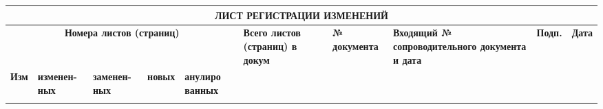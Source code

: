 \documentclass[11pt]{article}
\begin{document}
\newpage
\begin{table}[ht]
    \centering
    \begin{tabularx}{\textwidth}{|X|X|X|X|X|X|X|X|X|X|}
        \hline
        \multicolumn{10}{|c|}{\textbf{ЛИСТ РЕГИСТРАЦИИ ИЗМЕНЕНИЙ}} & \\
        \hline
        \multicolumn{5}{|c|}{\textbf{Номера листов (страниц)}} & \textbf{Всего листов (страниц) в докум} & \textbf{№ документа} & \textbf{Входящий № сопроводительного документа и дата} & \textbf{Подп.} & \textbf{Дата} \\
        \hline
        \textbf{Изм} & \textbf{изменен-ных} & \textbf{заменен-ных} & \textbf{новых} & \textbf{анулиро
ванных
} &  &  &  &  &  \\
        \hline
      &&&&&&&&& \\
      \hline
    \end{tabularx}

\end{table}
\end{document}
